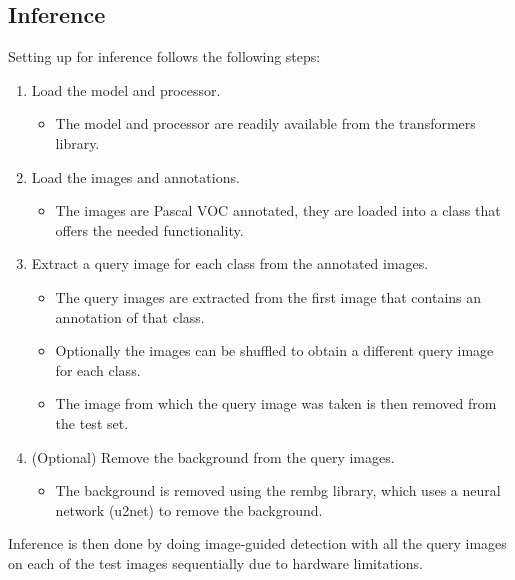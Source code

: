\subsection{Inference}
Setting up for inference follows the following steps:
\begin{enumerate}
    \item Load the model and processor.
        \begin{itemize}
            \item The model and processor are readily available from the transformers library.
        \end{itemize}
    \item Load the images and annotations.
        \begin{itemize}
            \item The images are Pascal VOC annotated, they are loaded into a class that offers the needed functionality.
        \end{itemize}
    \item Extract a query image for each class from the annotated images.
        \begin{itemize}
            \item The query images are extracted from the first image that contains an annotation of that class.
            \item Optionally the images can be shuffled to obtain a different query image for each class.
            \item The image from which the query image was taken is then removed from the test set. 
        \end{itemize}
    \item (Optional) Remove the background from the query images.
        \begin{itemize}
            \item The background is removed using the rembg library, which uses a neural network (u2net) to remove the background.
        \end{itemize}
\end{enumerate}
Inference is then done by doing image-guided detection with all the query images on each of the test images sequentially due to hardware limitations. 

